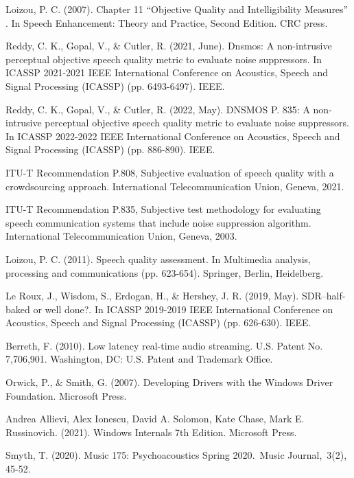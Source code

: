 \documentclass[a4paper, oneside, 13pt]{book}
\begin{document}
\begin{thebibliography}{80}
	
	Loizou, P. C. (2007). Chapter 11 ``Objective Quality and Intelligibility Measures'' . In Speech Enhancement: Theory and Practice, Second Edition. CRC press.
	
	
	Reddy, C. K., Gopal, V., \& Cutler, R. (2021, June). Dnsmos: A non-intrusive perceptual objective speech quality metric to evaluate noise suppressors. In ICASSP 2021-2021 IEEE International Conference on Acoustics, Speech and Signal Processing (ICASSP) (pp. 6493-6497). IEEE.
	
	Reddy, C. K., Gopal, V., \& Cutler, R. (2022, May). DNSMOS P. 835: A non-intrusive perceptual objective speech quality metric to evaluate noise suppressors. In ICASSP 2022-2022 IEEE International Conference on Acoustics, Speech and Signal Processing (ICASSP) (pp. 886-890). IEEE.
	
	ITU-T Recommendation P.808, Subjective evaluation of speech quality with a crowdsourcing approach. International Telecommunication Union, Geneva, 2021.
	
	ITU-T Recommendation P.835, Subjective test methodology for evaluating speech communication systems that include noise suppression algorithm. International Telecommunication Union, Geneva, 2003.
	
	Loizou, P. C. (2011). Speech quality assessment. In Multimedia analysis, processing and communications (pp. 623-654). Springer, Berlin, Heidelberg.
	
	
	
	Le Roux, J., Wisdom, S., Erdogan, H., \& Hershey, J. R. (2019, May). SDR–half-baked or well done?. In ICASSP 2019-2019 IEEE International Conference on Acoustics, Speech and Signal Processing (ICASSP) (pp. 626-630). IEEE.
	
	
	
	Berreth, F. (2010). Low latency real-time audio streaming. U.S. Patent No. 7,706,901. Washington, DC: U.S. Patent and Trademark Office.
	
	Orwick, P., \& Smith, G. (2007). Developing Drivers with the Windows Driver Foundation. Microsoft Press.
	
	Andrea Allievi, Alex Ionescu, David A. Solomon, Kate Chase, Mark E. Russinovich. (2021). Windows Internals 7th Edition. Microsoft Press.
	
	Smyth, T. (2020). Music 175: Psychoacoustics Spring 2020. Music Journal, 3(2), 45-52.
	

\end{thebibliography}
\end{document}
